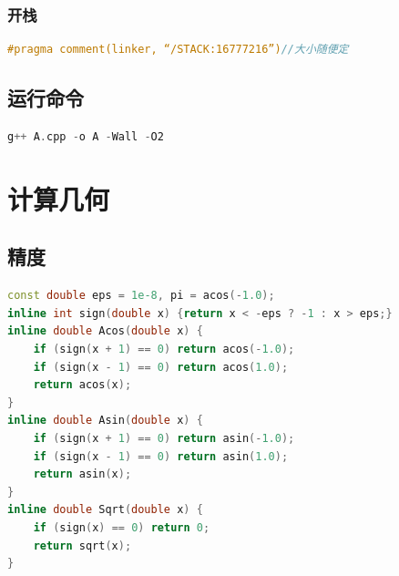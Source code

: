 \documentclass[landscape,a4paper]{article}
\begin{document}
	\begin{spacing}{0.3}	
	\begin{multicols}{2}
	
	\tableofcontents
	
	\subsubsection{开栈}
\begin{lstlisting}[language=C++]
#pragma comment(linker, “/STACK:16777216”)//大小随便定
\end{lstlisting}
\subsection{运行命令}
\begin{lstlisting}[language=C++]
g++ A.cpp -o A -Wall -O2
\end{lstlisting}
	
\section{计算几何}

\subsection{精度}
\begin{lstlisting}[language=C++]
const double eps = 1e-8, pi = acos(-1.0);
inline int sign(double x) {return x < -eps ? -1 : x > eps;}
inline double Acos(double x) {
	if (sign(x + 1) == 0) return acos(-1.0);
	if (sign(x - 1) == 0) return acos(1.0);
	return acos(x);
}
inline double Asin(double x) {
	if (sign(x + 1) == 0) return asin(-1.0);
	if (sign(x - 1) == 0) return asin(1.0);
	return asin(x);
}
inline double Sqrt(double x) {
	if (sign(x) == 0) return 0;
	return sqrt(x);
}
\end{lstlisting}

\end{multicols}
\end{spacing}
\end{document}
